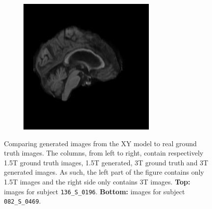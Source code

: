 \documentclass[11pt, fleqn, titlepage]{article}
\newcommand\skipperer{0.45pt}
\newcommand{\1}[1]{\mathds{1}\left[#1\right]}
\begin{document}
\begin{figure}[H]
\begin{subfigure}[b]{0.7\textwidth}
		\hskip\skipperer
		\includegraphics[width=0.22\linewidth]{imgs/082_S_0469/XY_model_082_S_0469_yz_3}
	\end{subfigure}
	\caption{Comparing generated images from the XY model to real ground truth images. The columns, from left to right, contain respectively 1.5T ground truth images, 1.5T  generated, 3T ground truth and 3T generated images. As such, the left part of the figure contains only 1.5T images and the right side only contains 3T images. \textbf{Top:} images for subject \texttt{136\_S\_0196}. \textbf{Bottom:} images for subject \texttt{082\_S\_0469}.}
	\label{fig:xy_quality_comparison}
\end{figure}
\end{document}
